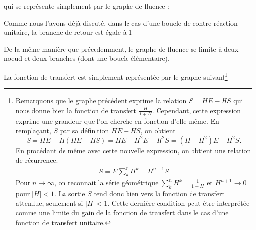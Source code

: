 qui se représente simplement par le graphe de fluence :
\begin{center}
\end{center}
Comme nous l'avons déjà discuté, dans le cas d'une boucle 
de contre-réaction unitaire, la branche de retour est égale à 1
\begin{center}
\end{center}
De la même manière que précedemment, le graphe de fluence se limite à deux noeud 
et deux branches (dont une boucle élémentaire).
\begin{center}
\end{center}
La fonction de transfert est simplement représentée par le graphe suivant\footnote{Remarquons 
que le graphe précédent exprime la relation $S=HE-HS$ qui nous donne bien la fonction de 
transfert $\frac{H}{1+H}$. Cependant, cette expression exprime une grandeur que l'on 
cherche en fonction d'elle même. En remplaçant, $S$ par sa définition $HE-HS$, on obtient
$$S=HE-H(HE-HS)=HE-H^2E-H^2S=(H-H^2)E-H^2S.$$ En procédant de même avec cette nouvelle expression, 
on obtient une relation de récurrence. 
\begin{align*}
S=E\sum_k^n H^k-H^{n+1}S
\end{align*}
Pour $n\rightarrow\infty$, on reconnait la série géométrique $\sum_k^nH^k=\frac{1}{1-H}$ et $H^{n+1}\rightarrow 0$ pour $|H|<1$.
La sortie $S$ tend donc bien vers la fonction de transfert attendue, seulement si $|H|<1$. 
Cette dernière condition peut être interprétée comme une limite du gain de la fonction de 
transfert dans le cas d'une fonction de transfert unitaire.
}
\begin{center}
\end{center}

